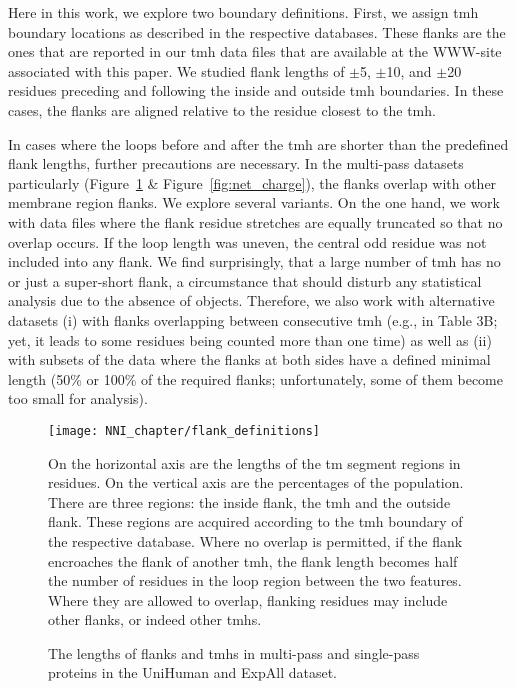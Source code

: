 Here in this work, we explore two boundary definitions. First, we assign \gls{tmh} boundary locations as described in the respective databases. These flanks are the ones that are reported in our \gls{tmh} data files that are available at the WWW-site associated with this paper. We studied flank lengths of $\pm$5, $\pm$10, and $\pm$20 residues preceding and following the inside and outside \gls{tmh} boundaries. In these cases, the flanks are aligned relative to the residue closest to the \gls{tmh}.

In cases where the loops before and after the \gls{tmh} are shorter than the predefined flank lengths, further precautions are necessary. In the multi-pass datasets particularly (Figure~\ref{fig:flank_definitions} \& Figure~\ref{fig:net_charge}), the flanks overlap with other membrane region flanks. We explore several variants. On the one hand, we work with data files where the flank residue stretches are equally truncated so that no overlap occurs. If the loop length was uneven, the central odd residue was not included into any flank. We find surprisingly, that a large number of \gls{tmh} has no or just a super-short flank, a circumstance that should disturb any statistical analysis due to the absence of objects. Therefore, we also work with alternative datasets (i) with flanks overlapping between consecutive \gls{tmh} (e.g., in Table 3B; yet, it leads to some residues being counted more than one time) as well as (ii) with subsets of the data where the flanks at both sides have a defined minimal length (50\% or 100\% of the required flanks; unfortunately, some of them become too small for analysis).

\begin{figure}[!ht]
\centering
\texttt{[image: NNI\_chapter/flank\_definitions]}
\caption{The lengths of flanks and \gls{tmh}s in multi-pass and single-pass proteins in the UniHuman and ExpAll dataset.}
\medskip
\justify
\small
On the horizontal axis are the lengths of the \gls{tm} segment regions in residues. On the vertical axis are the percentages of the population. There are three regions: the inside flank, the \gls{tmh} and the outside flank. These regions are acquired according to the \gls{tmh} boundary of the respective database. Where no overlap is permitted, if the flank encroaches the flank of another \gls{tmh}, the flank length becomes half the number of residues in the loop region between the two features. Where they are allowed to overlap, flanking residues may include other flanks, or indeed other \gls{tmh}s.
\label{fig:flank_definitions}
\end{figure}


